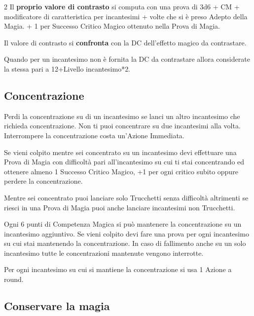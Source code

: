 \begin{multicols}{2}
Il \textbf{proprio valore di contrasto} si computa con una prova di 3d6 + CM + modificatore di caratteristica per incantesimi + volte che si è preso Adepto della Magia. + 1 per Successo Critico Magico ottenuto nella Prova di Magia.

Il valore di contrasto si \textbf{confronta} con la DC dell'effetto magico da contrastare.

Quando per un incantesimo non è fornita la DC da contrastare allora considerate la stessa pari a 12+Livello incantesimo*2.

\subsection{Concentrazione}\label{magieconcentrazione}\hypertarget{magieconcentrazione}{}

Perdi la concentrazione su di un incantesimo se lanci un altro incantesimo che richieda concentrazione. Non ti puoi concentrare su due incantesimi alla volta. Interrompere la concentrazione costa un'Azione Immediata.

Se vieni colpito mentre sei concentrato su un incantesimo devi effettuare una Prova di Magia con difficoltà pari all'incantesimo su cui ti stai concentrando ed ottenere almeno 1 Successo Critico Magico, +1 per ogni critico subito oppure perdere la concentrazione.


Mentre sei concentrato puoi lanciare solo Trucchetti senza difficoltà altrimenti se riesci in una Prova di Magia puoi anche lanciare incantesimi non Trucchetti.

Ogni 6 punti di Competenza Magica si può mantenere la concentrazione su un incantesimo aggiuntivo. Se vieni colpito devi fare una prova per ogni incantesimo su cui stai mantenendo la concentrazione. In caso di fallimento anche su un solo incantesimo tutte le concentrazioni mantenute vengono interrotte.

Per ogni incantesimo su cui si mantiene la concentrazione si usa 1 Azione a round.

\subsection{Conservare la magia}\label{magieconservare}


\end{multicols}
